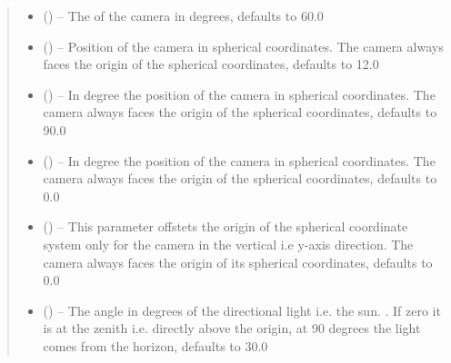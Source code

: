 \documentclass[letterpaper,10pt,english]{sphinxmanual}
\begin{document}
\begin{fulllineitems}
\begin{fulllineitems}
\begin{quote}
\begin{description}
\begin{itemize}
\item {} 
 (\sphinxstyleliteralemphasis{\sphinxupquote{, }}) -- The  of the camera in degrees, defaults to 60.0

\item {} 
 (\sphinxstyleliteralemphasis{\sphinxupquote{, }}) -- Position of the camera in spherical coordinates. The camera always faces the origin of the spherical coordinates, defaults to 12.0

\item {} 
 (\sphinxstyleliteralemphasis{\sphinxupquote{, }}) -- In degree the position of the camera in spherical coordinates. The camera always faces the origin of the spherical coordinates, defaults to 90.0

\item {} 
 (\sphinxstyleliteralemphasis{\sphinxupquote{, }}) -- In degree the position of the camera in spherical coordinates. The camera always faces the origin of the spherical coordinates, defaults to 0.0

\item {} 
 (\sphinxstyleliteralemphasis{\sphinxupquote{, }}) -- This parameter offstets the origin of the spherical coordinate system only for the camera in the vertical i.e y-axis direction. The camera always faces the origin of its spherical coordinates, defaults to 0.0

\item {} 
 (\sphinxstyleliteralemphasis{\sphinxupquote{, }}) -- The angle in degrees of the directional light i.e. the sun. . If zero it is at the zenith i.e. directly above the origin, at 90 degrees the light comes from the horizon, defaults to 30.0


\end{itemize}
\end{description}
\end{quote}
\end{fulllineitems}
\end{fulllineitems}
\end{document}

